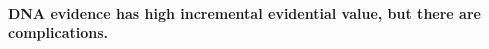 \documentclass[10pt]{article}
\begin{document}


\paragraph{DNA evidence has high incremental evidential value, but there are complications.}
\end{document}
